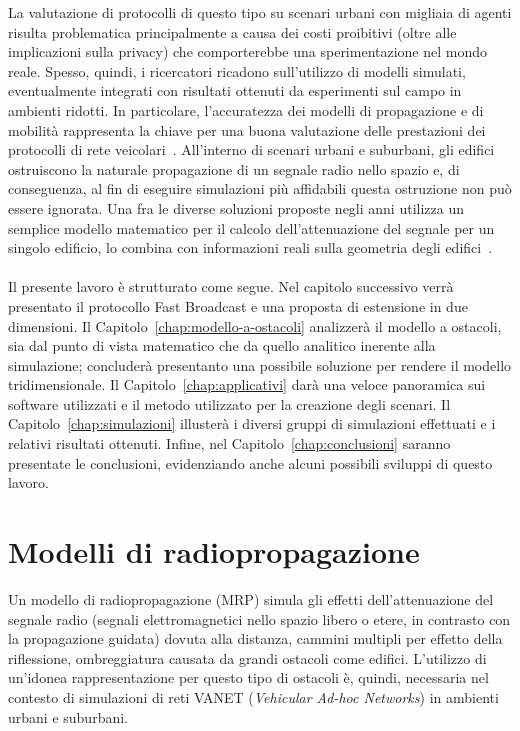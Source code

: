 La valutazione di protocolli di questo tipo su scenari urbani con migliaia di agenti risulta
problematica principalmente a causa dei costi proibitivi (oltre alle implicazioni sulla privacy)
che comporterebbe una sperimentazione nel mondo reale.
Spesso, quindi, i ricercatori ricadono sull'utilizzo di modelli simulati, eventualmente integrati con risultati ottenuti
da esperimenti sul campo in ambienti ridotti.
In particolare, l'accuratezza dei modelli di propagazione e di mobilità rappresenta la chiave per una buona valutazione delle prestazioni
dei protocolli di rete veicolari~\cite{4020783}.
All'interno di scenari urbani e suburbani, gli edifici ostruiscono la naturale propagazione di un segnale radio nello spazio
e, di conseguenza, al fin di eseguire simulazioni più affidabili questa ostruzione non può essere ignorata.
Una fra le diverse soluzioni proposte negli anni utilizza un semplice modello matematico
per il calcolo dell'attenuazione del segnale per un singolo edificio, lo combina con informazioni reali
sulla geometria degli edifici~\cite{Carpenter:2015:OMI:2756509.2756512}.

\paragraph{}
Il presente lavoro è strutturato come segue.
Nel capitolo successivo verrà presentato il protocollo Fast Broadcast e una proposta di estensione in due dimensioni.
Il Capitolo~\ref{chap:modello-a-ostacoli} analizzerà il modello a ostacoli, sia dal punto di vista matematico che da quello analitico inerente alla simulazione;
concluderà presentanto una possibile soluzione per rendere il modello tridimensionale.
Il Capitolo~\ref{chap:applicativi} darà una veloce panoramica sui software utilizzati e il metodo utilizzato per la creazione degli scenari.
Il Capitolo~\ref{chap:simulazioni} illusterà i diversi gruppi di simulazioni effettuati e i relativi risultati ottenuti.
Infine, nel Capitolo~\ref{chap:conclusioni} saranno presentate le conclusioni, evidenziando anche alcuni possibili sviluppi di questo lavoro.
%
\section{Modelli di radiopropagazione}\label{sec:modelli-propagazione}
Un modello di radiopropagazione (MRP) simula gli effetti dell'attenuazione del segnale radio (segnali elettromagnetici nello spazio libero o etere, in contrasto con la propagazione guidata)
dovuta alla distanza, cammini multipli per effetto della riflessione, ombreggiatura causata da grandi ostacoli come edifici.
L'utilizzo di un'idonea rappresentazione per questo tipo di ostacoli è, quindi, necessaria nel contesto di simulazioni di reti VANET (\textit{Vehicular Ad-hoc Networks}) in ambienti urbani
e suburbani.

